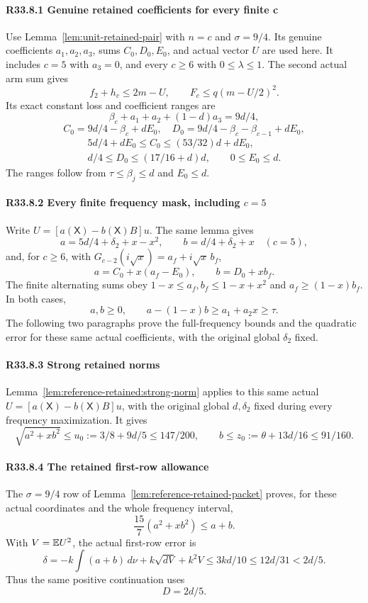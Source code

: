\paragraph{R33.8.1 Genuine retained coefficients for every finite c}
Use Lemma~\ref{lem:unit-retained-pair} with $n=c$ and $\sigma=9/4$.
Its genuine coefficients $a_1,a_2,a_3$, sums $C_0,D_0,E_0$, and
actual vector $U$ are used here. It includes $c=5$ with $a_3=0$,
and every $c\ge6$ with $0\le\lambda\le1$. The second actual arm sum gives
\[
 f_2+h_c\le2m-U,\qquad F_c\le q(m-U/2)^2.\tag{R33.A49}
\]
Its exact constant loss and coefficient ranges are
\[
 \beta_c+a_1+a_2+(1-d)a_3=9d/4,
\]
\[
 C_0=9d/4-\beta_c+dE_0,\quad
 D_0=9d/4-\beta_c-\beta_{c-1}+dE_0,
\]
\[
 \begin{gathered}
 5d/4+dE_0\le C_0\le(53/32)d+dE_0,\\
 d/4\le D_0\le(17/16+d)d,\qquad0\le E_0\le d.
 \end{gathered}\tag{R33.A50}
\]
The ranges follow from $\tau\le\beta_j\le d$ and $E_0\le d$.

\paragraph{R33.8.2 Every finite frequency mask, including $c=5$}
Write $U=[a(\mathsf X)-b(\mathsf X)B]u$. The same lemma gives
\[
 a=5d/4+\delta_2+x-x^2,\qquad b=d/4+\delta_2+x
 \quad(c=5),\tag{R33.A51}
\]
and, for $c\ge6$, with $G_{c-2}(i\sqrt x)=a_f+i\sqrt x\,b_f$,
\[
 a=C_0+x(a_f-E_0),\qquad b=D_0+xb_f.\tag{R33.A52}
\]
The finite alternating sums obey
$1-x\le a_f,b_f\le1-x+x^2$ and $a_f\ge(1-x)b_f$. In both cases,
\[
 a,b\ge0,\qquad a-(1-x)b\ge a_1+a_2x\ge\tau.\tag{R33.A53}
\]
The following two paragraphs prove the full-frequency bounds and the
quadratic error for these same actual coefficients, with the original
global $\delta_2$ fixed.

\paragraph{R33.8.3 Strong retained norms}
Lemma~\ref{lem:reference-retained:strong-norm} applies to this same actual
\(U=[a(\mathsf X)-b(\mathsf X)B]u\), with the original global
\(d,\delta_2\) fixed during every frequency maximization. It gives
\[
 \sqrt{a^2+xb^2}\le u_0:=3/8+9d/5\le147/200,
 \qquad b\le z_0:=\theta+13d/16\le91/160.\tag{R33.A54}
\]

\paragraph{R33.8.4 The retained first-row allowance}\label{part:R33.8.4}
The \(\sigma=9/4\) row of Lemma~\ref{lem:reference-retained-packet}
proves, for these actual coordinates and the whole frequency interval,
\[
 \frac{15}{7}(a^2+xb^2)\le a+b.\tag{R33.A57}
\]
With \(V=\mathbb E U^2\), the actual first-row error is
\[
 \delta=-k\int(a+b)\,d\nu+k\sqrt{dV}+k^2V
       \le3kd/10\le12d/31<2d/5.
\]
Thus the same positive continuation uses
\[
 D=2d/5.\tag{R33.A59}
\]

